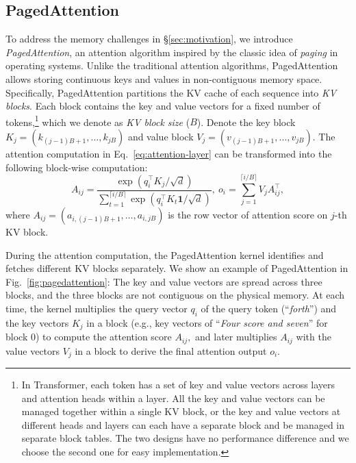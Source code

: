 \documentclass[sigplan,10pt]{acmart}
\newcommand{\tech}[0]{PagedAttention\xspace}
\begin{document}
\subsection{\tech}
\label{sec:pagedattention}

To address the memory challenges in \S\ref{sec:motivation}, we introduce \emph{\tech}, an attention algorithm inspired by the classic idea of \emph{paging} \cite{kilburn1962one} in operating systems. Unlike the traditional attention algorithms, \tech allows storing continuous keys and values in non-contiguous memory space. Specifically, \tech partitions the KV cache of each sequence into \emph{KV blocks}. Each block contains the key and value vectors for a fixed number of tokens,\footnote{In Transformer, each token has a set of key and value vectors across layers and attention heads within a layer. All the key and value vectors can be managed together within a single KV block, or the key and value vectors at different heads and layers can each have a separate block and be managed in separate block tables. The two designs have no performance difference and we choose the second one for easy implementation.}  which we denote as \emph{KV block size} ($B$). Denote the key block $K_j = (k_{(j - 1) B + 1}, \ldots, k_{jB})$ and value block $V_j = (v_{(j - 1) B + 1}, \ldots, v_{jB}).$ The attention computation in Eq.~\ref{eq:attention-layer} can be transformed into the following block-wise computation:
\begin{equation}
A_{ij} = \frac{\exp(q_i^\top K_j / \sqrt{d})}{\sum_{t=1}^{\lceil i/B \rceil}\exp(q_i^\top K_t\mathbf{1} / \sqrt{d})}, \ o_i = \sum_{j=1}^{\lceil i/B \rceil} V_j A_{ij}^\top, \label{eq:attention-layer}
\end{equation}
where $A_{ij} = (a_{i,(j - 1) B + 1}, \ldots, a_{i,jB})$ is the row vector of attention score on $j$-th KV block.

During the attention computation, the \tech kernel identifies and fetches different KV blocks separately. We show an example of \tech in Fig.~\ref{fig:pagedattention}: The key and value vectors are spread across three blocks, and the three blocks are not contiguous on the physical memory. At each time, the kernel multiplies the query vector $q_i$ of the query token (``\emph{forth}'') and the key vectors $K_j$ in a block (e.g., key vectors of ``\emph{Four score and seven}'' for block 0) to compute the attention score $A_{ij},$ and later multiplies $A_{ij}$ with the value vectors $V_j$ in a block to derive the final attention output $o_i.$ 
\end{document}
